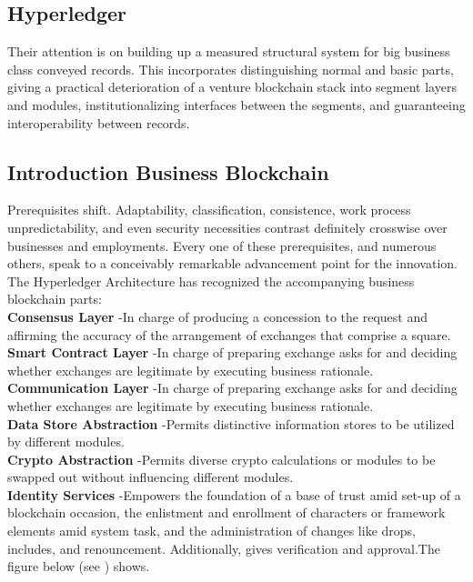 \subsection{Hyperledger }
Their attention is on building up a measured structural system for big business class conveyed records. This incorporates distinguishing normal and basic parts, giving a practical deterioration of a venture blockchain stack into segment layers and modules, institutionalizing interfaces between the segments, and guaranteeing interoperability between records.

\subsection{Introduction Business Blockchain} 
Prerequisites shift. Adaptability, classification, consistence, work process unpredictability, and even security necessities contrast definitely crosswise over businesses and employments. Every one of these prerequisites, and numerous others, speak to a conceivably remarkable advancement point for the innovation. \\
The Hyperledger Architecture has recognized the accompanying business blockchain parts:\\
\textbf{ Consensus Layer   }-In charge of producing a concession to the request and affirming the accuracy of the arrangement of exchanges that comprise a square.\\
\textbf{ Smart Contract Layer   }-In charge of preparing exchange asks for and deciding whether exchanges are legitimate by executing business rationale.\\
\textbf{ Communication Layer   }-In charge of preparing exchange asks for and deciding whether exchanges are legitimate by executing business rationale.\\
\textbf{ Data Store Abstraction   }-Permits distinctive information stores to be utilized by different modules.\\
\textbf{ Crypto Abstraction    }-Permits diverse crypto calculations or modules to be swapped out without influencing different modules.\\
\textbf{ Identity Services   }-Empowers the foundation of a base of trust amid set-up of a blockchain occasion, the enlistment and enrollment of characters or framework elements amid system task, and the administration of changes like drops, includes, and renouncement. Additionally, gives verification and approval.The figure below (see ) shows.\\
